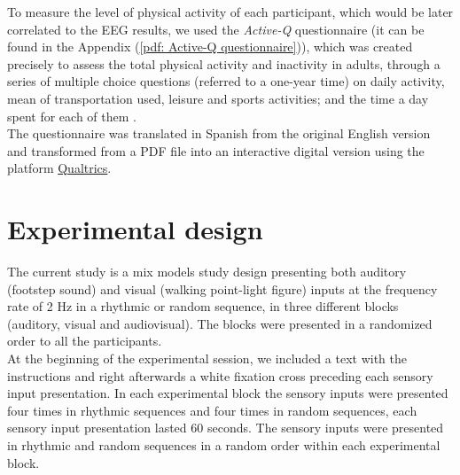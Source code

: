 To measure the level of physical activity of each participant, which would be later correlated to the EEG results, we used the \textit{Active-Q} questionnaire (it can be found in the Appendix (\ref{pdf: Active-Q questionnaire})), which was created precisely to assess the total physical activity and inactivity in adults, through a series of multiple choice questions (referred to a one-year time) on daily activity, mean of transportation used, leisure and sports activities; and the time a day spent for each of them \parencite{Bonn_2012}. \\
The questionnaire was translated in Spanish from the original English version and transformed from a PDF file into an interactive digital version using the platform \href{https://www.qualtrics.com/uk/?rid=ip&prevsite=en&newsite=uk&geo=ES&geomatch=uk}{Qualtrics}. 

\section{Experimental design}
The current study is a mix models study design presenting both auditory (footstep sound) and visual (walking point-light figure) inputs at the frequency rate of 2 Hz in a rhythmic or random sequence, in three different blocks (auditory, visual and audiovisual). The blocks were presented in a randomized order to all the participants. \\
At the beginning of the experimental session, we included a text with the instructions and right afterwards a white fixation cross preceding each sensory input presentation. 
In each experimental block the sensory inputs were presented four times in rhythmic sequences and four times in random sequences, each sensory input presentation lasted 60 seconds. The sensory inputs were presented in rhythmic and random sequences in a random order within each experimental block.  

